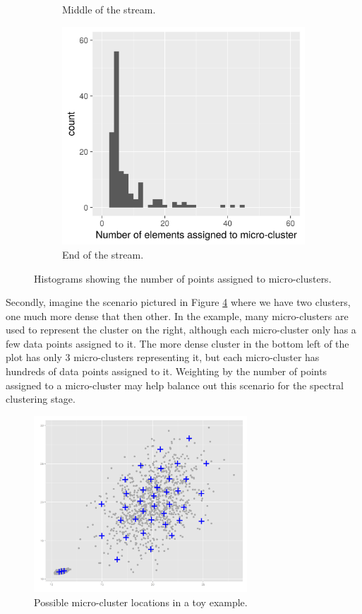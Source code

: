 \begin{figure}[h!]
\begin{subfigure}{0.32\textwidth}
  \caption{Middle of the stream.}
  \label{fig:hist2}
  \end{subfigure}
\begin{subfigure}{0.32\textwidth}
    \centering
    \includegraphics[width = \textwidth]{microcluster_histograms/s_set_1_hist_t_2000.png}
  \caption{End of the stream.}
  \label{fig:hist3}
  \end{subfigure}
    \caption{Histograms showing the number of points assigned to micro-clusters.}
  \label{fig:microHist}
\end{figure}

Secondly, imagine the scenario pictured in Figure \ref{fig:motivate_weighting} where we have two clusters, one much more dense that then other.  In the example, many micro-clusters are used to represent the  cluster on the right, although each micro-cluster only has a few data points assigned to it. The more dense cluster in the bottom left of the plot has only 3 micro-clusters representing it, but each micro-cluster has hundreds of data points assigned to it.   Weighting by the number of points assigned to a micro-cluster may help balance out this scenario for the spectral clustering stage. 

\begin{figure}[h]
  \centering
  \includegraphics[width = 8cm]{motivate_weighting.png}
  \caption{Possible micro-cluster  locations in a toy example.}
\label{fig:motivate_weighting}
\end{figure}

